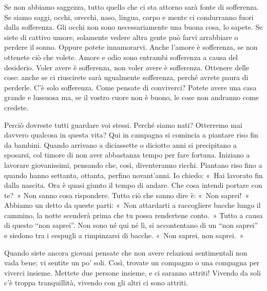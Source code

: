 Se non abbiamo saggezza, tutto quello che ci sta attorno sarà fonte di
sofferenza. Se siamo saggi, occhi, orecchi, naso, lingua, corpo e mente
ci condurranno fuori dalla sofferenza. Gli occhi non sono
necessariamente una buona cosa, lo sapete. Se siete di cattivo umore,
solamente vedere altra gente può farvi arrabbiare o perdere il sonno.
Oppure potete innamorarvi. Anche l'amore è sofferenza, se non ottenete
ciò che volete. Amore e odio sono entrambi sofferenza a causa del
desiderio. Voler avere è sofferenza, non voler avere è sofferenza.
Ottenere delle cose: anche se ci riuscirete sarà ugualmente sofferenza,
perché avrete paura di perderle. C'è solo sofferenza. Come pensate di
conviverci? Potete avere una casa grande e lussuosa ma, se il vostro
cuore non è buono, le cose non andranno come credete.

Perciò dovreste tutti guardare voi stessi. Perché siamo nati? Otterremo
mai davvero qualcosa in questa vita? Qui in campagna si comincia a
piantare riso fin da bambini. Quando arrivano a diciassette o diciotto
anni si precipitano a sposarsi, col timore di non aver abbastanza tempo
per fare fortuna. Iniziano a lavorare giovanissimi, pensando che, così,
diventeranno ricchi. Piantano riso fino a quando hanno settanta,
ottanta, perfino novant'anni. Io chiedo: «~Hai lavorato fin dalla
nascita. Ora è quasi giunto il tempo di andare. Che cosa intendi portare
con te?~» Non sanno cosa rispondere. Tutto ciò che sanno dire è: «~Non
saprei!~» Abbiamo un detto da queste parti: «~Non attardarti a
raccogliere bacche lungo il cammino, la notte scenderà prima che tu
possa rendertene conto.~» Tutto a causa di questo ``non saprei''. Non
sono né qui né lì, si accontentano di un ``non saprei'' e siedono tra i
cespugli a rimpinzarsi di bacche. «~Non saprei, non saprei.~»

Quando siete ancora giovani pensate che non avere relazioni sentimentali
non vada bene; vi sentite un po' soli. Così, trovate un compagno o una
compagna per viverci insieme. Mettete due persone insieme, e ci saranno
attriti! Vivendo da soli c'è troppa tranquillità, vivendo con gli altri
ci sono attriti.

